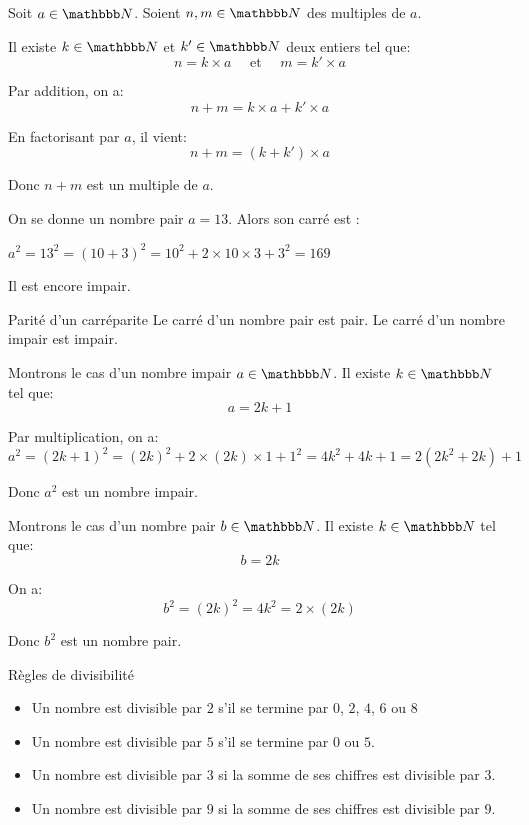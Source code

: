 \documentclass[10pt,a4paper,openany,twoside,prof]{book}
\begin{document}
\begin{deme}{}{}
Soit $a\in\N$. Soient $n, m\in\N$ des multiples de $a$.

Il existe $k\in\N$ et $k'\in\N$ deux entiers tel que:
$$ n =k\times a  \quad \text{ et } \quad m = k' \times a$$

Par addition, on a:
$$ n + m = k\times a  + k' \times a $$

En factorisant par $a$, il vient:
$$ n + m = (k  + k') \times a $$

Donc $n+m$ est un multiple de $a$.
\end{deme}

\begin{ex}{}{}
	On se donne un nombre pair $a=13$. Alors son carré est :

	$a^2=13^2=(10+3)^2 = 10^2+2\times10\times3+3^2 = 169$

	Il est encore impair.
\end{ex}


\begin{prop}{Parité d'un carré}{parite}
Le carré d'un nombre pair est pair. Le carré d'un nombre impair est impair.
\end{prop}

\begin{deme}{}{}
	Montrons le cas d'un nombre impair $a\in\N$. Il existe $k\in\N$ tel que:
$$ a =2k+1 $$

Par multiplication, on a:
$$ a^2 = \left(2k+1 \right)^2 = (2k)^2 + 2 \times (2k) \times 1 + 1^2 = 4k^2 + 4k +1 = 2(2k^2+2k)+1$$

Donc $a^2$ est un nombre impair.

\medskip
Montrons le cas d'un nombre pair $b\in\N$. Il existe $k\in\N$ tel que:
$$ b =2k $$

On a:
$$ b^2 = \left(2k \right)^2 = 4k^2= 2\times(2k)$$

Donc $b^2$ est un nombre pair.
\end{deme}

\begin{prop}{Règles de divisibilité}{}
\begin{itemize}
\item  Un nombre est divisible par $2$ s'il se termine par $0$, $2$, $4$, $6$ ou $8$
\item  Un nombre est divisible par $5$ s'il se termine par $0$ ou $5$.

\item  Un nombre est divisible par $3$ si la somme de ses chiffres est divisible par $3$.


\item  Un nombre est divisible par $9$ si la somme de ses chiffres est divisible par $9$.

\end{itemize}
\end{prop}
\end{document}
